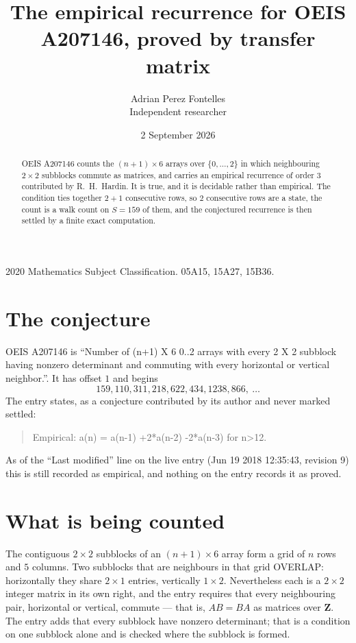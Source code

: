 \documentclass[11pt,a4paper]{article}
\title{The empirical recurrence for OEIS A207146, proved by transfer matrix}
\author{Adrian Perez Fontelles\\ \small Independent researcher}
\date{2 September 2026}
\theoremstyle{plain}
\theoremstyle{definition}
\begin{document}
\maketitle

\begin{abstract}
OEIS A207146 counts the $(n+1)\times6$ arrays over $\{0,\dots,2\}$ in which
neighbouring $2\times2$ subblocks commute as matrices, and carries an empirical recurrence
of order $3$ contributed by R.~H.~Hardin. It is true, and it is decidable rather than
empirical. The condition ties together $2+1$ consecutive rows, so $2$ consecutive rows are
a state, the count is a walk count on $S=159$ of them, and the conjectured recurrence is then
settled by a finite exact computation.
\end{abstract}

\noindent\small 2020 Mathematics Subject Classification. 05A15, 15A27, 15B36.\normalsize

\section{The conjecture}

OEIS A207146 is ``Number of (n+1) X 6 0..2 arrays with every 2 X 2 subblock having nonzero determinant and commuting with every horizontal or vertical neighbor.''. It has offset $1$ and begins
\[
159, 110, 311, 218, 622, 434, 1238, 866,\ \dots
\]
The entry states, as a conjecture contributed by its author and never marked settled:
\begin{quote}
Empirical: a(n) = a(n-1) +2*a(n-2) -2*a(n-3) for n>12.
\end{quote}
As of the ``Last modified'' line on the live entry (Jun 19 2018 12:35:43, revision 9) this is still
recorded as empirical, and nothing on the entry records it as proved.

\section{What is being counted}

The contiguous $2\times2$ subblocks of an $(n+1)\times6$ array form a grid of $n$
rows and $5$ columns. Two subblocks that are neighbours in that
grid OVERLAP: horizontally they share $2\times1$ entries, vertically
$1\times2$. Nevertheless each is a $2\times2$ integer matrix in its own right, and
the entry requires that every neighbouring pair, horizontal or vertical, commute --- that is,
$AB=BA$ as matrices over $\mathbf{Z}$. The entry adds that every subblock have nonzero determinant; that is a condition on one subblock alone and is checked where the subblock is formed.
\end{document}
